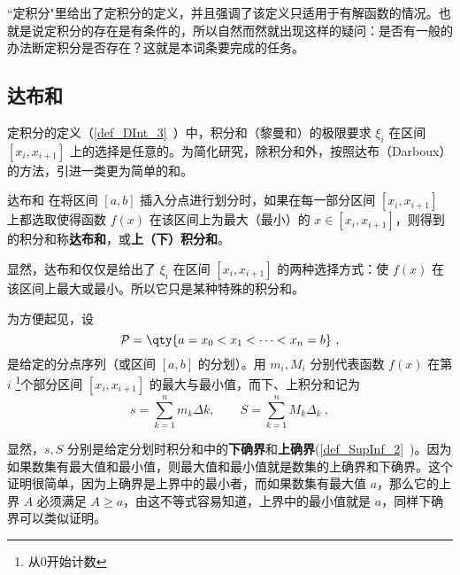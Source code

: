 
“定积分"里给出了定积分的定义，并且强调了该定义只适用于有解函数的情况。也就是说定积分的存在是有条件的，所以自然而然就出现这样的疑问：是否有一般的办法断定积分是否存在？这就是本词条要完成的任务。
\subsection{达布和}
定积分的定义（\autoref{def_DInt_3}~）中，积分和（黎曼和）的极限要求 $\xi_i$ 在区间 $[x_i,x_{i+1}]$ 上的选择是任意的。为简化研究，除积分和外，按照达布（Darboux）的方法，引进一类更为简单的和。
\begin{definition}{达布和}
在将区间 $[a,b]$ 插入分点进行划分时，如果在每一部分区间 $[x_i,x_{i+1}]$ 上都选取使得函数 $f(x)$ 在该区间上为最大（最小）的 $x\in[x_i,x_{i+1}]$，则得到的积分和称\textbf{达布和}，或\textbf{上（下）积分和}。
\end{definition}
显然，达布和仅仅是给出了 $\xi_i$ 在区间 $[x_i,x_{i+1}]$ 的两种选择方式：使 $f(x)$ 在该区间上最大或最小。所以它只是某种特殊的积分和。

为方便起见，设
\begin{equation}
\mathcal P = \qty{a = x_0 < x_1 < \dots < x_n = b}~,
\end{equation}
是给定的分点序列（或区间 $[a,b]$ 的分划）。用 $m_i,M_i$ 分别代表函数 $f(x)$ 在第 $i$ \footnote{从0开始计数}个部分区间 $[x_i,x_{i+1}]$ 的最大与最小值，而下、上积分和记为
\begin{equation}
s= \sum_{k = 1}^n m_k\Delta k, \qquad  S = \sum_{k = 1}^n M_k \Delta_k~,
\end{equation}

显然，$s,S$ 分别是给定分划时积分和中的\textbf{下确界}和\textbf{上确界}(\autoref{def_SupInf_2}~)。因为如果数集有最大值和最小值，则最大值和最小值就是数集的上确界和下确界。这个证明很简单，因为上确界是上界中的最小者，而如果数集有最大值 $a$，那么它的上界 $A$ 必须满足 $A\geq a$，由这不等式容易知道，上界中的最小值就是 $a$，同样下确界可以类似证明。
